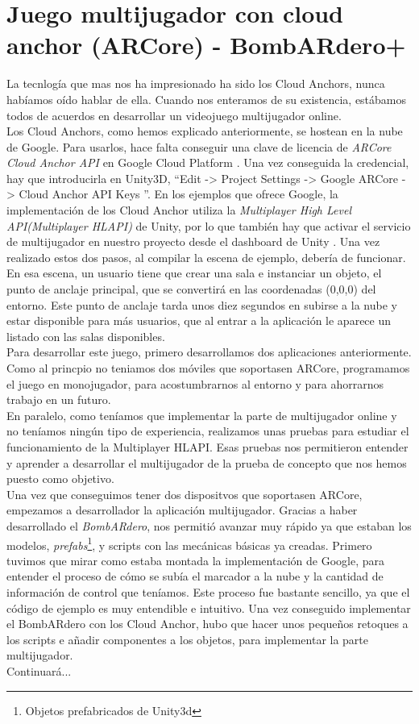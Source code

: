 \section{Juego multijugador con cloud anchor (ARCore) - BombARdero+}
La tecnlogía que mas nos ha impresionado ha sido los Cloud Anchors, nunca habíamos oído hablar de ella. Cuando nos enteramos de su existencia, estábamos todos de acuerdos en desarrollar un videojuego multijugador online.\\
Los Cloud Anchors, como hemos explicado anteriormente, se hostean en la nube de Google. Para usarlos, hace falta conseguir una clave de licencia de \textit{ARCore Cloud Anchor API} en Google Cloud Platform \cite{GCloud}. Una vez conseguida la credencial, hay que introducirla en Unity3D, ``Edit -> Project Settings -> Google ARCore -> Cloud Anchor API Keys ''. En los ejemplos que ofrece Google, la implementación de los Cloud Anchor utiliza la \textit{Multiplayer High Level API(Multiplayer HLAPI)} de Unity, por lo que también hay que activar el servicio de multijugador en nuestro proyecto desde el dashboard de Unity \cite{UnityDashboard}. Una vez realizado estos dos pasos, al compilar la escena de ejemplo, debería de funcionar. En esa escena, un usuario tiene que crear una sala e instanciar un objeto, el punto de anclaje principal, que se convertirá en las coordenadas (0,0,0) del entorno.
Este punto de anclaje tarda unos diez segundos en subirse a la nube y estar disponible para más usuarios, que al entrar a la aplicación le aparece un listado con las salas disponibles. \\
Para desarrollar este juego, primero desarrollamos dos aplicaciones anteriormente.
Como al princpio no teniamos dos móviles que soportasen ARCore, programamos el juego en monojugador, para acostumbrarnos al entorno y para ahorrarnos trabajo en un futuro.\\
En paralelo, como teníamos que implementar la parte de multijugador online y no teníamos ningún tipo de experiencia, realizamos unas pruebas para estudiar el funcionamiento de la Multiplayer HLAPI. Esas pruebas nos permitieron entender y aprender a desarrollar el multijugador de la prueba de concepto que nos hemos puesto como objetivo.\\
Una vez que conseguimos tener dos dispositvos que soportasen ARCore, empezamos a desarrollador la aplicación multijugador. Gracias a haber desarrollado el \textit{BombARdero}, nos permitió avanzar muy rápido ya que estaban los modelos, \textit{prefabs}\footnote{ Objetos prefabricados de Unity3d}, y scripts con las mecánicas básicas ya creadas. Primero tuvimos que mirar como estaba montada la implementación de Google, para entender el proceso de cómo se subía el marcador a la nube y la cantidad de información de control que teníamos. Este proceso fue bastante sencillo, ya que el código de ejemplo es muy entendible e intuitivo. Una vez conseguido implementar el BombARdero con los Cloud Anchor, hubo que hacer unos pequeños retoques a los scripts e añadir componentes a los objetos, para implementar la parte multijugador.\\
Continuará...



